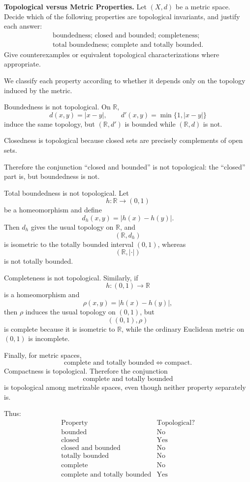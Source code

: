 \begin{problem}[CP-II-0334]
\label{prob:cp-ii-0334}
\textbf{Topological versus Metric Properties.}
Let \((X,d)\) be a metric space. Decide which of the following properties are topological invariants, and justify each answer:
\[
\begin{gathered}
\text{boundedness; closed and bounded; completeness;}\\
\text{total boundedness; complete and totally bounded.}
\end{gathered}
\]
Give counterexamples or equivalent topological characterizations where appropriate.
\end{problem}

\begin{solution}
We classify each property according to whether it depends only on the topology induced by the metric.

Boundedness is not topological. On \(\mathbb R\),
\[
d(x,y)=|x-y|,
\qquad
d'(x,y)=\min\{1,|x-y|\}
\]
induce the same topology, but \((\mathbb R,d')\) is bounded while \((\mathbb R,d)\) is not.

Closedness is topological because closed sets are precisely complements of open sets.

Therefore the conjunction ``closed and bounded'' is not topological: the ``closed'' part is, but boundedness is not.

Total boundedness is not topological. Let
\[
h:\mathbb R\to(0,1)
\]
be a homeomorphism and define
\[
d_h(x,y)=|h(x)-h(y)|.
\]
Then \(d_h\) gives the usual topology on \(\mathbb R\), and
\[
(\mathbb R,d_h)
\]
is isometric to the totally bounded interval \((0,1)\), whereas
\[
(\mathbb R,|\cdot|)
\]
is not totally bounded.

Completeness is not topological. Similarly, if
\[
h:(0,1)\to\mathbb R
\]
is a homeomorphism and
\[
\rho(x,y)=|h(x)-h(y)|,
\]
then \(\rho\) induces the usual topology on \((0,1)\), but
\[
((0,1),\rho)
\]
is complete because it is isometric to \(\mathbb R\), while the ordinary Euclidean metric on \((0,1)\) is incomplete.

Finally, for metric spaces,
\[
\text{complete and totally bounded}
\iff
\text{compact}.
\]
Compactness is topological. Therefore the conjunction
\[
\boxed{\text{complete and totally bounded}}
\]
is topological among metrizable spaces, even though neither property separately is.

Thus:
\[
\boxed{
\begin{array}{c|c}
\text{Property}&\text{Topological?}\\ \hline
\text{bounded}&\text{No}\\
\text{closed}&\text{Yes}\\
\text{closed and bounded}&\text{No}\\
\text{totally bounded}&\text{No}\\
\text{complete}&\text{No}\\
\text{complete and totally bounded}&\text{Yes}
\end{array}}
\]
\end{solution}


